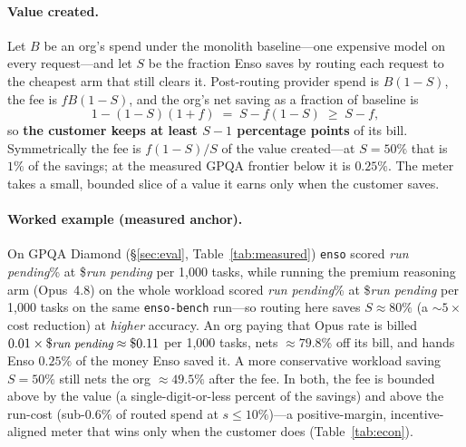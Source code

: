 \documentclass[11pt]{article}
\newcommand{\runpending}{\textit{\small run pending}}
\providecommand{\hEnsoGPQAacc}{\runpending}
\providecommand{\hEnsoGPQAcost}{\runpending}
\providecommand{\hOpusGPQAacc}{\runpending}
\providecommand{\hOpusGPQAcost}{\runpending}
\begin{document}
\paragraph{Value created.} Let $B$ be an org's spend under the monolith
baseline---one expensive model on every request---and let $S$ be the fraction Enso
saves by routing each request to the cheapest arm that still clears it. Post-routing
provider spend is $B(1-S)$, the fee is $fB(1-S)$, and the org's net saving as a
fraction of baseline is
\begin{equation}
1-(1-S)(1+f) \;=\; S - f(1-S)\;\ge\; S - f,
\end{equation}
so \textbf{the customer keeps at least $S-1$ percentage points} of its bill.
Symmetrically the fee is $f(1-S)/S$ of the value created---at $S=50\%$ that is $1\%$
of the savings; at the measured GPQA frontier below it is $0.25\%$. The
meter takes a small, bounded slice of a value it earns only when the customer saves.

\paragraph{Worked example (measured anchor).} On GPQA Diamond
(\S\ref{sec:eval}, Table~\ref{tab:measured}) \texttt{enso} scored \hEnsoGPQAacc\% at
\$\hEnsoGPQAcost{} per 1{,}000 tasks, while running the premium reasoning arm
(Opus~4.8) on the whole workload scored \hOpusGPQAacc\% at \$\hOpusGPQAcost{} per
1{,}000 tasks on the same \texttt{enso-bench} run---so routing here saves
$S \approx 80\%$ (a ${\sim}5\times$ cost reduction) at \emph{higher} accuracy. An org
paying that Opus rate is billed $0.01\times\$\hEnsoGPQAcost \approx \$0.11$ per
1{,}000 tasks, nets $\approx 79.8\%$ off its bill, and hands Enso $0.25\%$ of the
money Enso saved it. A more conservative workload saving $S=50\%$ still nets the org
$\approx 49.5\%$ after the fee. In both, the fee is bounded above by the value (a
single-digit-or-less percent of the savings) and above the run-cost (sub-$0.6\%$ of
routed spend at $s\le10\%$)---a positive-margin, incentive-aligned meter that wins
only when the customer does (Table~\ref{tab:econ}).
\end{document}
